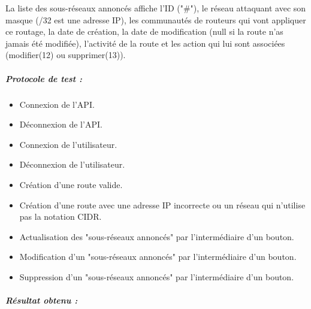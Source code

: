 La liste des sous-réseaux annoncés affiche l'ID ("\#"), le réseau attaquant avec son masque (/32 est une adresse IP), les communautés de routeurs qui vont appliquer ce routage, la date de création, la date de modification (null si la route n'as jamais été modifiée), l'activité de la route et les action qui lui sont associées (modifier(12) ou supprimer(13)).

\subparagraph{Protocole de test :}
\begin{itemize}
    \item Connexion de l'API.%
    \item Déconnexion de l'API.%
    \item Connexion de l'utilisateur.%
    \item Déconnexion de l'utilisateur.%
    \item Création d'une route valide.%
    \item Création d'une route avec une adresse IP incorrecte ou un réseau qui n'utilise pas la notation CIDR.%
    \item Actualisation des "sous-réseaux annoncés" par l'intermédiaire d'un bouton.%
    \item Modification d'un "sous-réseaux annoncés" par l'intermédiaire d'un bouton.%
    \item Suppression d'un "sous-réseaux annoncés" par l'intermédiaire d'un bouton.%
    
\end{itemize}
\subparagraph{Résultat obtenu :}
